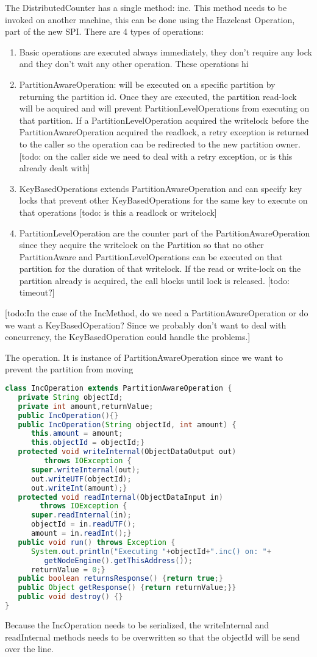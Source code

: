 The DistributedCounter has a single method: inc. This method needs to be invoked on another machine, this can be done using the Hazelcast Operation, part of the new SPI. There are 4 types of operations:
\begin{enumerate}
\item Basic operations are executed always immediately, they don't require any lock and they don't wait any other operation. These operations hi
\item PartitionAwareOperation: will be executed on a specific partition by returning the partition id. Once they are executed, the partition read-lock will be acquired and will prevent PartitionLevelOperations from executing on that partition. If a PartitionLevelOperation acquired the writelock before the PartitionAwareOperation acquired the readlock, a retry exception is returned to the caller so the operation can be redirected to the new partition owner. [todo: on the caller side we need to deal with a retry exception, or is this already dealt with]
\item KeyBasedOperations extends PartitionAwareOperation and can specify key locks that prevent other KeyBasedOperations for the same key to execute on that operations [todo: is this a readlock or writelock]
\item PartitionLevelOperation are the counter part of the PartitionAwareOperation since they acquire the writelock on the Partition so that no other PartitionAware and PartitionLevelOperations can be executed on that partition for the duration of that writelock. If the read or write-lock on the partition already is acquired, the call blocks until lock is released. [todo: timeout?]
\end{enumerate}
[todo:In the case of the IncMethod, do we need a PartitionAwareOperation or do we want a KeyBasedOperation? Since we probably don't want to deal with concurrency, the KeyBasedOperation could handle the problems.]

The operation. It is instance of PartitionAwareOperation since we want to prevent the partition from moving
\begin{lstlisting}[language=java]
class IncOperation extends PartitionAwareOperation {
   private String objectId;
   private int amount,returnValue;
   public IncOperation(){}
   public IncOperation(String objectId, int amount) {
      this.amount = amount;
      this.objectId = objectId;}
   protected void writeInternal(ObjectDataOutput out) 
         throws IOException {
      super.writeInternal(out);
      out.writeUTF(objectId);
      out.writeInt(amount);}
   protected void readInternal(ObjectDataInput in) 
        throws IOException {
      super.readInternal(in);
      objectId = in.readUTF();
      amount = in.readInt();}
   public void run() throws Exception {
      System.out.println("Executing "+objectId+".inc() on: "+
         getNodeEngine().getThisAddress());            
      returnValue = 0;}
   public boolean returnsResponse() {return true;}
   public Object getResponse() {return returnValue;}}
   public void destroy() {}
}	
\end{lstlisting}
Because the IncOperation needs to be serialized, the writeInternal and readInternal methods needs to be overwritten so that the objectId will be send over the line.

